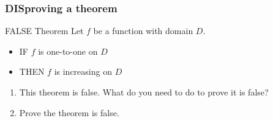 \documentclass[14pt]{beamer}
\newcommand {\DS} [1] {${\displaystyle #1}$}
\newcommand{\p}{\pause}
\begin{document}

\begin{frame}
\frametitle{DISproving a theorem}

\begin{block}{ FALSE Theorem}
	Let $f$ be a function with domain $D$.
		\begin{itemize}
			\item  IF $f$ is one-to-one on \DS{D}
			\item  THEN $f$ is increasing on \DS{D}
		\end{itemize}
\end{block}

\vfill  \p

\begin{enumerate}
	\item  This theorem is false.  What do you need to do to prove it is false? \p
	\item  Prove the theorem is false.
\end{enumerate}

\end{frame}
\end{document}
